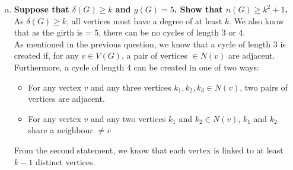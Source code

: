\begin{enumerate}[a)]
    \boldmath
    \item \textbf{Suppose that $\delta(G) \geq k$ and $g(G) = 5$. Show that $n(G) \geq k^2 + 1$.} \\
    \linebreak 
    \unboldmath
    As $\delta(G) \geq k$, all vertices must have a degree of at least $k$. We also know that as the girth is = 5, there can be no cycles of length 3 or 4. \\
    \linebreak 
    As mentioned in the previous question, we know that a cycle of length 3 is created if, for any $v \in V(G)$, a pair of vertices $\in N(v)$ are adjacent. Furthermore, a cycle of length 4 can be created in one of two ways:
    \begin{itemize}
        \item For any vertex $v$ and any three vertices $k_1, k_2, k_3 \in N(v)$, two pairs of vertices are adjacent. 
        \item For any vertex $v$ and any two vertices $k_1$ and $k_2 \in N(v)$, $k_1$ and $k_2$ share a neighbour \textbf{\boldmath $\neq v$ \unboldmath} 
    \end{itemize}
    From the second statement, we know that each vertex is linked to at least $k-1$ distinct vertices. \\
    \linebreak 
    
\end{enumerate}
